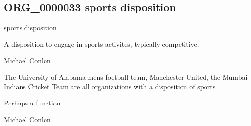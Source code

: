 \documentclass[letterpaper,10pt,english]{sphinxmanual}
\begin{document}
\subsection{ORG\_0000033 \sphinxhyphen{} sports disposition}
\label{\detokenize{doc-ORG_0000033:org-0000033-sports-disposition}}\label{\detokenize{doc-ORG_0000033:index-0}}\label{\detokenize{doc-ORG_0000033::doc}}
\begin{sphinxShadowBox}

\sphinxAtStartPar
sports disposition
\end{sphinxShadowBox}

\begin{sphinxShadowBox}

\sphinxAtStartPar
{\hyperref[\detokenize{doc-BFO_0000016::doc}]{}}
\end{sphinxShadowBox}

\begin{sphinxShadowBox}

\sphinxAtStartPar
A disposition to engage in sports activites, typically competitive.
\end{sphinxShadowBox}

\begin{sphinxShadowBox}

\sphinxAtStartPar
Michael Conlon 
\end{sphinxShadowBox}

\begin{sphinxShadowBox}

\sphinxAtStartPar
The University of Alabama mens football team, Manchester United, the Mumbai Indians Cricket Team are all organizations with a disposition of sports
\end{sphinxShadowBox}

\begin{sphinxShadowBox}

\sphinxAtStartPar
Perhaps a function
\end{sphinxShadowBox}

\begin{sphinxShadowBox}

\sphinxAtStartPar
Michael Conlon 
\end{sphinxShadowBox}
\begin{quote}

\ignorespaces \end{quote}
\end{document}
